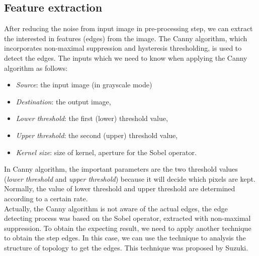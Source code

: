 \subsection{Feature extraction}
After reducing the noise from input image in pre-processing step, we can extract the interested in features (edges) from the image. The Canny\cite{canny1986computational} algorithm, which incorporates non-maximal suppression and hysteresis thresholding, is used to detect the edges. The inputs which we need to know when applying the Canny algorithm as follows:
\begin{itemize}
\item \textit{Source}: the input image (in grayscale mode)
\item \textit{Destination}: the output image,
\item \textit{Lower threshold}: the first (lower) threshold value,
\item \textit{Upper threshold}: the second (upper) threshold value,
\item \textit{Kernel size}: size of kernel, aperture for the Sobel operator.
\end{itemize}
In Canny algorithm, the important parameters are the two threshold values (\textit{lower threshold} and \textit{upper threshold}) because it will decide which pixels are kept. Normally, the value of lower threshold and upper threshold are determined according to a certain rate. \\
Actually, the Canny algorithm is not aware of the actual edges, the edge detecting process was based on the Sobel operator, extracted with non-maximal suppression. To obtain the expecting result, we need to apply another technique to obtain the step edges. In this case, we can use the technique to analysis the structure of topology to get the edges. This technique was proposed by Suzuki\cite{suzuki1985topological}.
